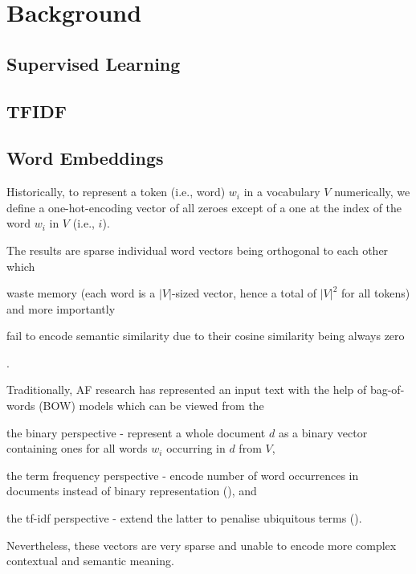 \section{Background}\label{sec:background}

\subsection{Supervised Learning}\label{subsec:supervised-learning}

\subsection{TFIDF}\label{subsec:tfidf}

\subsection{Word Embeddings}\label{subsec:word-embeddings}
Historically, to represent a token (i.e., word) $w_{i}$ in a vocabulary $V$ numerically, we define a one-hot-encoding vector of all zeroes except of a one at the index of the word $w_{i}$ in $V$ (i.e., $i$).

The results are sparse individual word vectors being orthogonal to each other which \begin{enumerate*}
    \item waste memory (each word is a $|V|$-sized vector, hence a total of $|V|^{2}$ for all tokens) and more importantly
    \item fail to encode semantic similarity due to their cosine similarity being always zero
\end{enumerate*}.


Traditionally, AF research has represented an input text with the help of bag-of-words (BOW) models which can be viewed from the  \begin{enumerate*}
    \item the binary perspective - represent a whole document $d$ as a binary vector containing ones for all words $w_{i}$ occurring in $d$ from $V$, 
    \item the term frequency perspective - encode number of word occurrences in documents instead of binary representation (\cite{Xu2013AnAT}), and 
    \item the tf-idf perspective - extend the latter to penalise ubiquitous terms (\cite{SprckJones1972ASI}).
\end{enumerate*} 
Nevertheless, these vectors are very sparse and unable to encode more complex contextual and semantic meaning.

